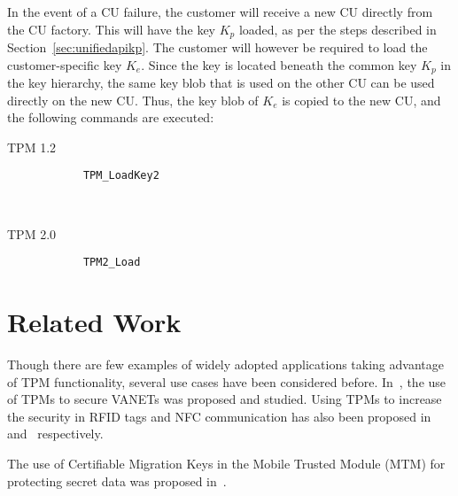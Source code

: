 {In the event of a CU failure, the customer will receive a new CU directly from the CU factory. This will have the key $K_p$ loaded, as per the steps described in Section~\ref{sec:unifiedapikp}. The customer will however be required to load the customer-specific key $K_e$. Since the key is located beneath the common key $K_p$ in the key hierarchy, the same key blob that is used on the other CU can be used directly on the new CU. Thus, the key blob of $K_e$ is copied to the new CU, and the following commands are executed:
\begin{center}
	\begin{minipage}{0.4\linewidth}
		\begin{center}
			TPM 1.2
		\end{center}
		\begin{tpmcommands}
			\begin{verbatim}
			TPM_LoadKey2
			\end{verbatim}
		\end{tpmcommands}
	\end{minipage}
	~~~~~~~~
	\begin{minipage}{0.4\linewidth}
		\begin{center}
			TPM 2.0
		\end{center}
		\begin{tpmcommands}
			\begin{verbatim}
			TPM2_Load
			\end{verbatim}
		\end{tpmcommands}
	\end{minipage}
\end{center}

\section{Related Work} \label{sec:tpmhas:relatedwork}
Though there are few examples of widely adopted applications taking advantage of TPM functionality, several use cases have been considered before. In~\cite{wagan:2010,guette:2008}, the use of TPMs to secure VANETs was proposed and studied. Using TPMs to increase the security in RFID tags and NFC communication has also been proposed in~\cite{mubarak:2010} and~\cite{hutter:2010} respectively.

The use of Certifiable Migration Keys in the Mobile Trusted Module (MTM) for protecting secret data was proposed in~\cite{kang:2009}.

}
